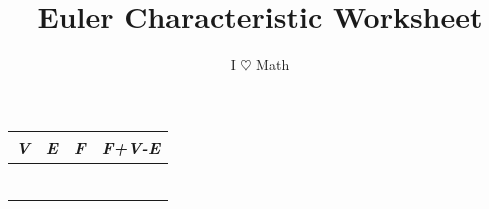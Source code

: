 \documentclass[20pt]{extarticle}
\title{Euler Characteristic Worksheet}
\author{I $\heartsuit$ Math}
\date{}
\begin{document}

\Huge
\begin{center}
\begin{tabular}{c|c|c|c}
\it V & \it E & \it F & \it F+V-E \\ \hline
\phantom{MMM} & \phantom{MMM} & \phantom{MMM} & \phantom{MMM} \\
\phantom{MMM} & \phantom{MMM} & \phantom{MMM} & \phantom{MMM} \\
\phantom{MMM} & \phantom{MMM} & \phantom{MMM} & \phantom{MMM} \\
\phantom{MMM} & \phantom{MMM} & \phantom{MMM} & \phantom{MMM} \\
\phantom{MMM} & \phantom{MMM} & \phantom{MMM} & \phantom{MMM} \\
\phantom{MMM} & \phantom{MMM} & \phantom{MMM} & \phantom{MMM} \\
\end{tabular}
\end{center}
\end{document}
